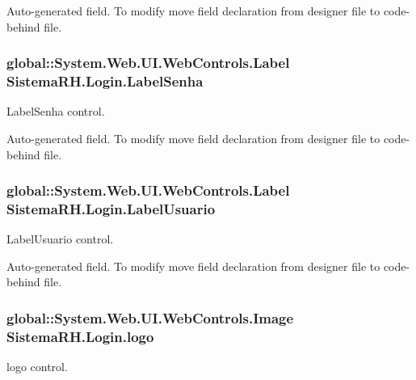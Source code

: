 Auto-\/generated field. To modify move field declaration from designer file to code-\/behind file. \hypertarget{class_sistema_r_h_1_1_login_a1f74f1a9d8ce23c339e8049f61fbd6bf}{
\subsubsection[{LabelSenha}]{\setlength{\rightskip}{0pt plus 5cm}global::System.Web.UI.WebControls.Label {\bf SistemaRH.Login.LabelSenha}}}
\label{class_sistema_r_h_1_1_login_a1f74f1a9d8ce23c339e8049f61fbd6bf}


LabelSenha control. 

Auto-\/generated field. To modify move field declaration from designer file to code-\/behind file. \hypertarget{class_sistema_r_h_1_1_login_a7b1d7ad62ac3f9378d259aaaf4d0f123}{
\subsubsection[{LabelUsuario}]{\setlength{\rightskip}{0pt plus 5cm}global::System.Web.UI.WebControls.Label {\bf SistemaRH.Login.LabelUsuario}}}
\label{class_sistema_r_h_1_1_login_a7b1d7ad62ac3f9378d259aaaf4d0f123}


LabelUsuario control. 

Auto-\/generated field. To modify move field declaration from designer file to code-\/behind file. \hypertarget{class_sistema_r_h_1_1_login_afc6748e829a1cf51cbed2993bbc3df94}{
\subsubsection[{logo}]{\setlength{\rightskip}{0pt plus 5cm}global::System.Web.UI.WebControls.Image {\bf SistemaRH.Login.logo}}}
\label{class_sistema_r_h_1_1_login_afc6748e829a1cf51cbed2993bbc3df94}


logo control. 

